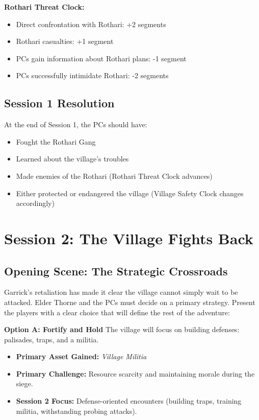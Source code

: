 \documentclass[11pt]{article}
\begin{document}
\textbf{Rothari Threat Clock:}
\begin{itemize}
\item Direct confrontation with Rothari: +2 segments
\item Rothari casualties: +1 segment
\item PCs gain information about Rothari plans: -1 segment
\item PCs successfully intimidate Rothari: -2 segments
\end{itemize}

\subsection{Session 1 Resolution}

At the end of Session 1, the PCs should have:
\begin{itemize}
\item Fought the Rothari Gang
\item Learned about the village's troubles
\item Made enemies of the Rothari (Rothari Threat Clock advances)
\item Either protected or endangered the village (Village Safety Clock changes accordingly)
\end{itemize}

\section{Session 2: The Village Fights Back}

\subsection{Opening Scene: The Strategic Crossroads}

Garrick's retaliation has made it clear the village cannot simply wait to be attacked. Elder Thorne and the PCs must decide on a primary strategy. Present the players with a clear choice that will define the rest of the adventure:

\textbf{Option A: Fortify and Hold}
The village will focus on building defenses: palisades, traps, and a militia.
\begin{itemize}
\item \textbf{Primary Asset Gained:} \textit{Village Militia}
\item \textbf{Primary Challenge:} Resource scarcity and maintaining morale during the siege.
\item \textbf{Session 2 Focus:} Defense-oriented encounters (building traps, training militia, withstanding probing attacks).
\end{itemize}
\end{document}
